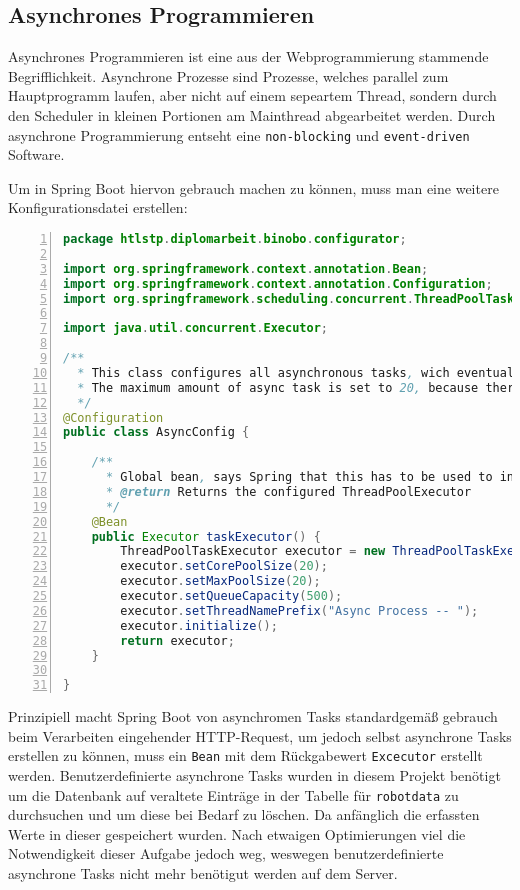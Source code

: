 \documentclass[paper=a4,12pt]{scrreprt}
\begin{document}
\subsection{Asynchrones Programmieren}

Asynchrones Programmieren ist eine aus der Webprogrammierung stammende Begrifflichkeit. Asynchrone Prozesse sind Prozesse, welches parallel zum Hauptprogramm laufen, aber nicht auf einem sepeartem
Thread, sondern durch den Scheduler in kleinen Portionen am Mainthread abgearbeitet werden. Durch asynchrone Programmierung entseht eine \texttt{non-blocking} und \texttt{event-driven} Software\cite{async_coding}.\newline

Um in Spring Boot hiervon gebrauch machen zu können, muss man eine weitere Konfigurationsdatei erstellen:\newline


\begin{lstlisting}[caption={Async - Task Konfiguration}, captionpos=b, label={listing:async_config}, language=java, numbers=left,
  stepnumber=1]
package htlstp.diplomarbeit.binobo.configurator;

import org.springframework.context.annotation.Bean;
import org.springframework.context.annotation.Configuration;
import org.springframework.scheduling.concurrent.ThreadPoolTaskExecutor;

import java.util.concurrent.Executor;

/**
  * This class configures all asynchronous tasks, wich eventually will get executed and yielded to the scheduler.
  * The maximum amount of async task is set to 20, because there is no need for more in the current state of the project.
  */
@Configuration
public class AsyncConfig {

    /**
      * Global bean, says Spring that this has to be used to instantiate the ThreadPoolExecutor
      * @return Returns the configured ThreadPoolExecutor
      */
    @Bean
    public Executor taskExecutor() {
        ThreadPoolTaskExecutor executor = new ThreadPoolTaskExecutor();
        executor.setCorePoolSize(20);
        executor.setMaxPoolSize(20);
        executor.setQueueCapacity(500);
        executor.setThreadNamePrefix("Async Process -- ");
        executor.initialize();
        return executor;
    }

}
\end{lstlisting}

Prinzipiell macht Spring Boot von asynchromen Tasks standardgemäß gebrauch beim Verarbeiten eingehender HTTP-Request, um jedoch selbst asynchrone Tasks erstellen
zu können, muss ein \texttt{Bean} mit dem Rückgabewert \texttt{Excecutor} erstellt werden.\newline
Benutzerdefinierte asynchrone Tasks wurden in diesem Projekt benötigt um die Datenbank auf veraltete Einträge in der Tabelle für \texttt{robotdata} zu durchsuchen und um diese bei Bedarf zu löschen. Da anfänglich die erfassten Werte in
dieser gespeichert wurden. Nach etwaigen Optimierungen viel die Notwendigkeit dieser Aufgabe jedoch weg, weswegen benutzerdefinierte asynchrone Tasks nicht mehr benötigut werden auf dem Server.\newline
\end{document}
